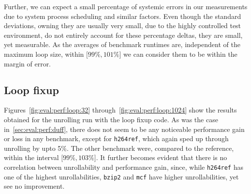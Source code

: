 Further, we can expect a small percentage of systemic errors in our measurements due to system process scheduling and similar factors.
Even though the standard deviations, owning they are usually very small, due to the highly controlled test environment, do not entirely account for these percentage deltas, they are small, yet measurable.
As the averages of benchmark runtimes are, independent of the maximum loop size, within $\lbrack 99\%, 101\% \rbrack$ we can consider them to be within the margin of error.

\subsection{Loop fixup}\label{sec:eval:perf:loop}

Figures~\ref{fig:eval:perf:loop:32} through~\ref{fig:eval:perf:loop:1024} show the results obtained for the unrolling run with the loop fixup code.
As was the case in~\cref{sec:eval:perf:duff}, there does not seem to be any noticeable performance gain or loss in any benchmark, except for \texttt{h264ref}, which again sped up through unrolling by upto 5\%.
The other benchmark were, compared to the reference, within the interval $\lbrack 99\%, 103\% \rbrack$.
It further becomes evident that there is no correlation between unrollability and performance gain, since, while \texttt{h264ref} has one of the highest unrollabilities, \texttt{bzip2} and \texttt{mcf} have higher unrollabilities, yet see no improvement.





